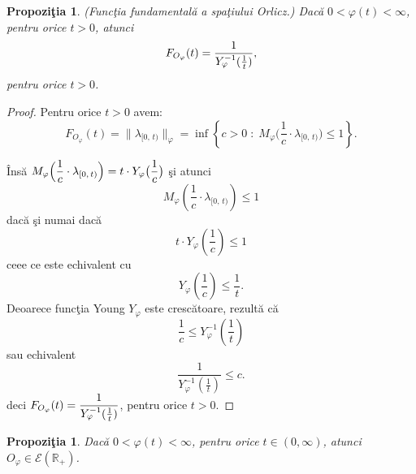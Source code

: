 \documentclass[ a4paper, 12pt]{report}
\newtheorem{prop}[theorem]{\bf Propozi\c tia }
\theoremstyle{definition}
\theoremstyle{remark}
\numberwithin{equation}{section}
\begin{document}
\begin{prop}{\rm (Func\c tia fundamental\u a a spa\c tiului Orlicz.)}
Dac\u a $0 < \varphi(t) < \infty$, pentru orice $t > 0$, atunci
$$F_{O_\varphi}(t) = \displaystyle\frac{1}{Y_\varphi^{-1}(\frac{1}{t})},$$ pentru orice $t > 0$.
\end{prop}

\begin{proof} Pentru orice $t > 0$ avem:
$$F_{O_\varphi}(t) = \lVert \lambda_{[0,\, t)}\rVert_\varphi = \inf\left\{ c > 0 \; : \; M_\varphi\Big( \frac{1}{c} \cdot \lambda_{[0,\, t)}\Big) \leq 1 \right\}.$$

\^Ins\u a $M_\varphi\Big(\displaystyle\frac{1}{c} \cdot \lambda_{[0,\, t)}\Big) = t \cdot Y_\varphi \big(\displaystyle\frac{1}{c}\big)$ \c si atunci
$$M_\varphi(\frac{1}{c} \cdot \lambda_{[0,\, t)}) \leq 1 $$ dac\u a \c si numai dac\u a
$$t \cdot Y_\varphi (\frac{1}{c}) \leq 1$$ ceee ce este echivalent cu
$$Y_\varphi(\frac{1}{c}) \leq \frac{1}{t}.$$ Deoarece func\c tia Young $Y_\varphi$ este cresc\u atoare, rezult\u a c\u a
$$\frac{1}{c} \leq Y_\varphi^{-1}(\frac{1}{t})$$ sau echivalent
$$\frac{1}{Y_\varphi^{-1}(\frac{1}{t})} \leq c.$$ deci $F_{O_\varphi}(t) = \displaystyle\frac{1}{Y_\varphi^{-1}(\frac{1}{t})}$, pentru orice $t > 0$.
\end{proof}

\begin{prop}
Dac\u a $0 < \varphi(t) < \infty$, pentru orice $t \in (0,\infty)$, atunci $O_\varphi \in \mathcal{E}(\mathbb{R}_+)$.
\end{prop}
\end{document}
